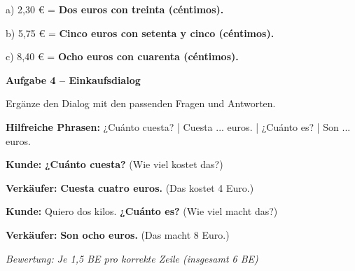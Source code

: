 \documentclass[11pt, a4paper]{article}
\newcommand{\fachfarbe}{spanisch}
\newcommand{\punktebox}[1]{\hfill\fbox{\small \_/#1}}
\newcommand{\lsg}[1]{\textcolor{loesung}{\textbf{#1}}}
\newenvironment{aufgabe}[1]{%
    \needspace{5\baselineskip}%
    \nopagebreak[4]%
    \vspace{10pt}
    \noindent\textbf{\textcolor{\fachfarbe}{Aufgabe #1}}
    \nopagebreak[4]%
    \vspace{5pt}
    \nopagebreak[4]%
    \begin{list}{}{\leftmargin=0pt}
    \item[]
}{%
    \end{list}
}
\begin{document}
\vspace{0.5em}

\noindent
a) 2,30 € = \lsg{Dos euros con treinta (céntimos).}

\vspace{1em}

\noindent
b) 5,75 € = \lsg{Cinco euros con setenta y cinco (céntimos).}

\vspace{1em}

\noindent
c) 8,40 € = \lsg{Ocho euros con cuarenta (céntimos).}

\vspace{15pt}


\begin{aufgabe}{4 -- Einkaufsdialog}
Ergänze den Dialog mit den passenden Fragen und Antworten. \punktebox{6}
\end{aufgabe}

\begin{hinweis}
\textbf{Hilfreiche Phrasen:} ¿Cuánto cuesta? | Cuesta ... euros. | ¿Cuánto es? | Son ... euros.
\end{hinweis}

\vspace{0.5em}

\noindent
\textbf{Kunde:} \lsg{¿Cuánto cuesta?} \hfill (Wie viel kostet das?)

\vspace{0.8em}

\noindent
\textbf{Verkäufer:} \lsg{Cuesta cuatro euros.} \hfill (Das kostet 4 Euro.)

\vspace{0.8em}

\noindent
\textbf{Kunde:} Quiero dos kilos. \lsg{¿Cuánto es?} \hfill (Wie viel macht das?)

\vspace{0.8em}

\noindent
\textbf{Verkäufer:} \lsg{Son ocho euros.} \hfill (Das macht 8 Euro.)

\vspace{0.5em}

\textit{Bewertung: Je 1,5 BE pro korrekte Zeile (insgesamt 6 BE)}

\end{document}
